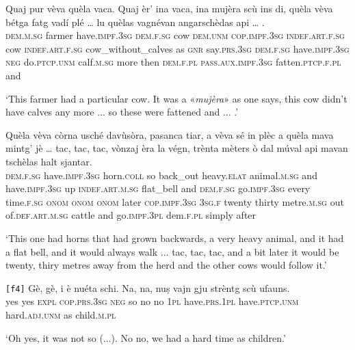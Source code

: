 \begin{linenumbers}
	\gll Quaj pur vèva quèla vaca. Quaj èr’ ina vaca, ina mujèra\footnotemark{} scù ins di, quèla vèva bétga fatg vadí plé … lu quèlas vagnévan angarschèdas api … .   \\
	\textsc{dem.m.sg} farmer have.\textsc{impf.3sg} \textsc{dem.f.sg} cow \textsc{dem.unm} \textsc{cop.impf.3sg} \textsc{indef.art.f.sg} cow \textsc{indef.art.f.sg} cow\_without\_calves as \textsc{gnr} say.\textsc{prs.3sg} \textsc{dem.f.sg} have.\textsc{impf.3sg} \textsc{neg} do.\textsc{ptcp.unm} calf.\textsc{m.sg} more {} then \textsc{dem.f.pl} \textsc{pass.aux.impf.3sg} fatten.\textsc{ptcp.f.pl} and \\
\end{linenumbers}
\medskip
\glt `This farmer had a particular cow. It was a «\textit{mujèra}» as one says, this cow didn't have calves any more ... so these were fattened and ... .'
\medskip

\begin{linenumbers}
	\gll  Quèla vèva còrna usché davùsòra, pasanca tiar, a vèva sé in plèc\footnotemark{} a quèla mava mintg’ jè … tac, tac, tac, vònzaj èra la végn, trènta mèters ò dal  múval api mavan tschèlas halt sjantar.  \\
	\textsc{dem.f.sg} have.\textsc{impf.3sg} horn.\textsc{coll} so back\_out heavy.\textsc{elat} animal.\textsc{m.sg} and have.\textsc{impf.3sg} up \textsc{indef.art.m.sg} flat\_bell and \textsc{dem.f.sg} go.\textsc{impf.3sg} every time.\textsc{f.sg} {} \textsc{onom} \textsc{onom} \textsc{onom} later \textsc{cop.impf.3sg} \textsc{3sg.f} twenty thirty metre.\textsc{m.sg} out of.\textsc{def.art.m.sg} cattle and go.\textsc{impf.3pl} dem.\textsc{f.pl} simply after\\
\end{linenumbers}
\medskip
\glt `This one had horns that had grown backwards, a very heavy animal, and it had a flat bell, and it would always walk ... tac, tac, tac, and a bit later it would be twenty, thiry metres away from the herd and the other cows would follow it.'
\medskip

\begin{linenumbers}
	\gll  \texttt{[f4]} Gè, gè, i è nuéta schi. Na, na, nuṣ vajn gju strèntg scù ufauns.  \\
{} yes yes \textsc{expl} \textsc{cop.prs.3sg} \textsc{neg} so no no \textsc{1pl} have.\textsc{prs.1pl} have.\textsc{ptcp.unm} hard.\textsc{adj.unm} as child.\textsc{m.pl}	\\
\end{linenumbers}
\medskip
\glt `Oh yes, it was not so (...). No no, we had a hard time as children.'
\medskip

